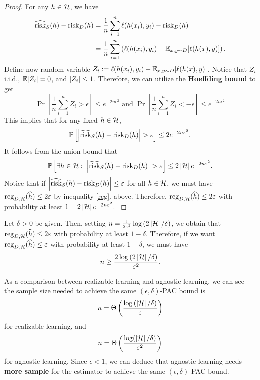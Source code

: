 \documentclass[a4paper]{article}
\begin{document}
\begin{proof}
{  For any $h \in \mathcal{H}$, we have
  \[
  \begin{aligned}
    \widehat{\operatorname{risk}}_S (h) - \operatorname{risk}_D(h)
    &= \frac{1}{n} \sum_{i=1}^n \ell(h(x_i), y_i)
    - \operatorname{risk}_D (h) \\
    &= \frac{1}{n} \sum_{i=1}^n \left(
      \ell(h(x_i), y_i) - \mathbb{E}_{x, y \sim D}
      [\ell(h(x), y)]
     \right).
  \end{aligned}
  \]
  Define now random variable $Z_i := \ell(h(x_i), y_i) -
  \mathbb{E}_{x, y \sim D} [\ell(h(x), y)]$. Notice that $Z_i$
  i.i.d., $\mathbb{E}[Z_i] = 0$, and $\left\lvert Z_i\right\rvert \leq 1$. Therefore,
  we can utilize the \textbf{Hoeffding bound} to get
  \[
  \Pr \left[ \frac{1}{n} \sum_{i=1}^n Z_i > \epsilon \right]
  \leq e^{- 2 n \epsilon^2} \text{ and }
  \Pr \left[ \frac{1}{n} \sum_{i=1}^n Z_i < -\epsilon \right]
  \leq e^{- 2 n \epsilon^2}
  \]
  This implies that for any fixed $h \in \mathcal{H}$,
  \[
  \mathbb{P} \left[ \left\lvert \widehat{\operatorname{risk}}_S(h) - \operatorname{risk}_D(h)\right\rvert > \varepsilon
  \right] \leq 2 e^{-2 n \varepsilon^2}.
  \]
  It follows from the union bound that
  \[
  \mathbb{P} \left[ \exists h \in \mathcal{H}: \;
  \left\lvert \widehat{\operatorname{risk}}_S(h) - \operatorname{risk}_D(h)\right\rvert > \varepsilon \right]
  \leq 2 \left\lvert \mathcal{H}\right\rvert e^{- 2 n \varepsilon^2}.
  \]
  Notice that if
  $\left\lvert \widehat{\operatorname{risk}}_S (h) - \operatorname{risk}_D (h)\right\rvert \leq \varepsilon$
  for all $h \in \mathcal{H}$, we must have $\operatorname{reg}_{D, \mathcal{H}}
  (\widehat{h}) \leq 2 \varepsilon$ by inequality \eqref{reg}.
  above. Therefore,
  $\operatorname{reg}_{D, \mathcal{H}} (\widehat{h}) \leq 2 \varepsilon$ with probability at least
  $1 - 2 \left\lvert \mathcal{H}\right\rvert e^{- 2 n \varepsilon^2}$.
}
\end{proof}

\begin{cor}
Let $\delta > 0$ be given. Then,
setting
$n = \frac{1}{2\varepsilon^2} \log \left( 2 \left\lvert \mathcal{H}\right\rvert /
\delta \right)$, we obtain that $\operatorname{reg}_{D, \mathcal{H}} (\widehat{h})
\leq 2\varepsilon$ with probability at least $1 - \delta$.
Therefore, if we want $\operatorname{reg}_{D, \mathcal{H}}
(\widehat{h}) \leq \varepsilon$ with probability at least $1 -
\delta$, we must have
\[
  n \geq \frac{2 \log
  \left( 2 \left\lvert \mathcal{H}\right\rvert / \delta \right)}
  {\varepsilon^2}.
\]
\end{cor}

As a comparison between realizable learning and agnostic
learning, we can see the sample size needed to
achieve the same $(\epsilon, \delta)$-PAC bound is
\[
n = \Theta \left( \frac{\log \left( \left\lvert \mathcal{H}\right\rvert / \delta
\right)}{\varepsilon} \right)
\]
for realizable learning, and
\[
n = \Theta \left( \frac{\log(\left\lvert \mathcal{H}\right\rvert / \delta)}{\varepsilon^2}
\right)
\]
for agnostic learning. Since $\epsilon < 1$,
we can deduce that agnostic learning needs
\textbf{more sample} for the estimator to achieve the
same $(\epsilon, \delta)$-PAC bound.
\end{document}
